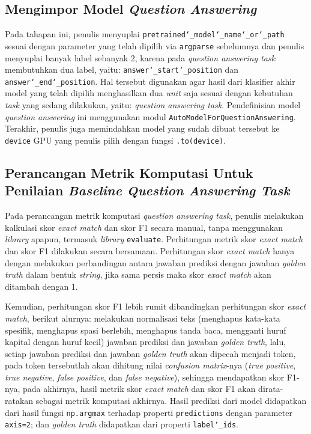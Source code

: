 \subsection{Mengimpor Model \emph{Question Answering}}
Pada tahapan ini, penulis menyuplai \texttt{pretrained\char`_model\char`_name\char`_or\char`_path} sesuai dengan parameter yang telah dipilih via \texttt{argparse} sebelumnya dan penulis menyuplai banyak label sebanyak 2, karena pada \emph{question answering task} membutuhkan dua label, yaitu: \texttt{answer\char`_start\char`_position} dan \texttt{answer\char`_end\char`_position}. Hal tersebut digunakan agar hasil dari klasifier akhir model yang telah dipilih menghasilkan dua \emph{unit} saja sesuai dengan kebutuhan \emph{task} yang sedang dilakukan, yaitu: \emph{question answering task}. Pendefinisian model \emph{question answering} ini menggunakan modul \texttt{AutoModelForQuestionAnswering}. Terakhir, penulis juga memindahkan model yang sudah dibuat tersebut ke \texttt{device} GPU yang penulis pilih dengan fungsi \texttt{.to(device)}.

\subsection{Perancangan Metrik Komputasi Untuk Penilaian \emph{Baseline Question Answering Task}}
Pada perancangan metrik komputasi \emph{question answering task}, penulis melakukan kalkulasi skor \emph{exact match} dan skor F1 secara manual, tanpa menggunakan \emph{library} apapun, termasuk \emph{library} \texttt{evaluate}. Perhitungan metrik skor \emph{exact match} dan skor F1 dilakukan secara bersamaan. Perhitungan skor \emph{exact match} hanya dengan melakukan perbandingan antara jawaban prediksi dengan jawaban \emph{golden truth} dalam bentuk \emph{string}, jika sama persis maka skor \emph{exact match} akan ditambah dengan 1. 

Kemudian, perhitungan skor F1 lebih rumit dibandingkan perhitungan skor \emph{exact match}, berikut alurnya: melakukan normalisasi teks (menghapus kata-kata spesifik, menghapus spasi berlebih, menghapus tanda baca, mengganti huruf kapital dengan huruf kecil) jawaban prediksi dan jawaban \emph{golden truth}, lalu, setiap jawaban prediksi dan jawaban \emph{golden truth} akan dipecah menjadi token, pada token tersebutlah akan dihitung nilai \emph{confusion matrix}-nya (\emph{true positive}, \emph{true negative}, \emph{false positive}, dan \emph{false negative}), sehingga mendapatkan skor F1-nya, pada akhirnya, hasil metrik skor \emph{exact match} dan skor F1 akan dirata-ratakan sebagai metrik komputasi akhirnya. Hasil prediksi dari model didapatkan dari hasil fungsi \texttt{np.argmax} terhadap properti \texttt{predictions} dengan parameter \texttt{axis=2}; dan \emph{golden truth} didapatkan dari properti \texttt{label\char`_ids}. 

